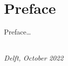 \chapter*{Preface}


Preface\ldots

\begin{flushright}
{\makeatletter\itshape
    \@author \\
    Delft, October 2022
\makeatother}
\end{flushright}

